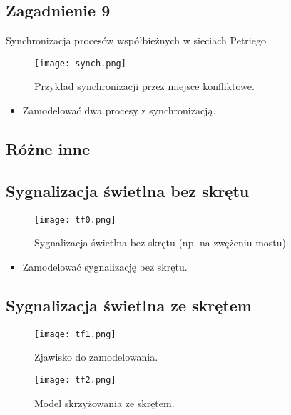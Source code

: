 \documentclass[a4paper,15pt]{article}
\newcommand{\question}[2]{
    \begin{tcolorbox}[colback=black!5!white,colframe=black,title={Zagadnienie #1}]
        #2
    \end{tcolorbox}
}
\begin{document}
\newpage
\subsection{Zagadnienie 9}
\question{9}{
Synchronizacja procesów współbieżnych w sieciach Petriego
}

\begin{figure}[H]
\centerline{\texttt{[image: synch.png]}}
\caption{Przykład synchronizacji przez miejsce konfliktowe.}
\label{fig:synch}
\end{figure}

\begin{framed}
\begin{itemize}
\item Zamodelować dwa procesy z synchronizacją.
\end{itemize}
\end{framed}



\newpage
\subsection{Różne inne}

\subsection{Sygnalizacja świetlna bez skrętu}
\begin{figure}[H]
\centerline{\texttt{[image: tf0.png]}}
\caption{Sygnalizacja świetlna bez skrętu (np. na zwężeniu mostu)}
\label{fig:tf1}
\end{figure}


\begin{framed}
\begin{itemize}
\item Zamodelować sygnalizację bez skrętu.
\end{itemize}
\end{framed}

\newpage
\subsection{Sygnalizacja świetlna ze skrętem}
\begin{figure}[H]
\centerline{\texttt{[image: tf1.png]}}
\caption{Zjawisko do zamodelowania.}
\label{fig:tf1}
\end{figure}
\begin{figure}[H]
\centerline{\texttt{[image: tf2.png]}}
\caption{Model skrzyżowania ze skrętem.}
\label{fig:tf2}
\end{figure}
\end{document}
